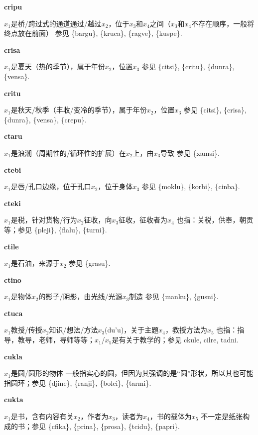 \documentclass[notitlepage,twocolumn,a4paper,10pt]{book}
\begin{document}
{\sffamily\bfseries cripu}\enspace {\ttfamily\bfseries[rip]}  $x_1$是桥\slash{}跨过式的通道通过\slash{}越过$x_2$，位于$x_3$和$x_4$之间（$x_3$和$x_4$不存在顺序，一般将终点放在前面） \textemdash{} 参见 \{bargu\}, \{kruca\}, \{ragve\}, \{kuspe\}.

{\sffamily\bfseries crisa}\enspace {\ttfamily\bfseries[cis]}  $x_1$是夏天（热的季节），属于年份$x_2$，位置$x_3$ \textemdash{} 参见 \{citsi\}, \{critu\}, \{dunra\}, \{vensa\}.

{\sffamily\bfseries critu} $x_1$是秋天\slash{}秋季（丰收\slash{}变冷的季节），属于年份$x_2$，位置$x_3$ \textemdash{} 参见 \{citsi\}, \{crisa\}, \{dunra\}, \{vensa\}, \{crepu\}.

{\sffamily\bfseries ctaru} $x_1$是浪潮（周期性的\slash{}循环性的扩展）在$x_2$上，由$x_3$导致 \textemdash{} 参见 \{xamsi\}.

{\sffamily\bfseries ctebi}\enspace {\ttfamily\bfseries[teb]}  $x_1$是唇\slash{}孔口边缘，位于孔口$x_2$，位于身体$x_3$ \textemdash{} 参见 \{moklu\}, \{korbi\}, \{cinba\}.

{\sffamily\bfseries cteki}\enspace {\ttfamily\bfseries[tek     ce'i]}  $x_1$是税，针对货物\slash{}行为$x_2$征收，向$x_3$征收，征收者为$x_4$ \textemdash{} 也指：关税，供奉，朝贡等；参见 \{pleji\}, \{flalu\}, \{turni\}.

{\sffamily\bfseries ctile} $x_1$是石油，来源于$x_2$ \textemdash{} 参见 \{grasu\}.

{\sffamily\bfseries ctino}\enspace {\ttfamily\bfseries[        ti'o]}  $x_1$是物体$x_2$的影子\slash{}阴影，由光线\slash{}光源$x_3$制造 \textemdash{} 参见 \{manku\}, \{gusni\}.

{\sffamily\bfseries ctuca}\enspace {\ttfamily\bfseries[    ctu]}  $x_1$教授\slash{}传授$x_2$知识\slash{}想法\slash{}方法$x_3$(du'u)，关于主题$x_4$，教授方法为$x_5$ \textemdash{} 也指：指导，教导，老师，导师等等；$x_1$\slash{}$x_5$是有关于教学的；参见 {ckule}, {cilre}, {tadni}.

{\sffamily\bfseries cukla}\enspace {\ttfamily\bfseries[cuk]}  $x_1$是圆\slash{}圆形的物体 \textemdash{} 一般指实心的圆，但因为其强调的是“圆”形状，所以其也可能指圆环；参见 \{djine\}, \{ranji\}, \{bolci\}, \{tarmi\}.

{\sffamily\bfseries cukta}\enspace {\ttfamily\bfseries[    cku]}  $x_1$是书，含有内容有关$x_2$，作者为$x_3$，读者为$x_4$，书的载体为$x_5$ \textemdash{} 不一定是纸张构成的书；参见 \{cfika\}, \{prina\}, \{prosa\}, \{tcidu\}, \{papri\}.
\end{document}
